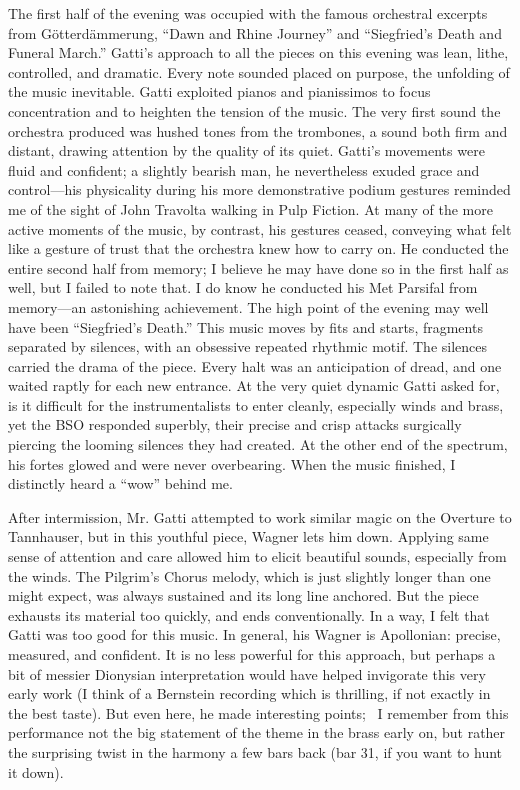 The first half of the evening was occupied with the famous orchestral excerpts from Götterdämmerung, “Dawn and Rhine Journey” and “Siegfried’s Death and Funeral March.” Gatti’s approach to all the pieces on this evening was lean, lithe, controlled, and dramatic. Every note sounded placed on purpose, the unfolding of the music inevitable. Gatti exploited pianos and pianissimos to focus concentration and to heighten the tension of the music. The very first sound the orchestra produced was hushed tones from the trombones, a sound both firm and distant, drawing attention by the quality of its quiet. Gatti’s movements were fluid and confident; a slightly bearish man, he nevertheless exuded grace and control—his physicality during his more demonstrative podium gestures reminded me of the sight of John Travolta walking in Pulp Fiction. At many of the more active moments of the music, by contrast, his gestures ceased, conveying what felt like a gesture of trust that the orchestra knew how to carry on. He conducted the entire second half from memory; I believe he may have done so in the first half as well, but I failed to note that. I do know he conducted his Met Parsifal from memory—an astonishing achievement. The high point of the evening may well have been “Siegfried’s Death.” This music moves by fits and starts, fragments separated by silences, with an obsessive repeated rhythmic motif. The silences carried the drama of the piece. Every halt was an anticipation of dread, and one waited raptly for each new entrance. At the very quiet dynamic Gatti asked for, is it difficult for the instrumentalists to enter cleanly, especially winds and brass, yet the BSO responded superbly, their precise and crisp attacks surgically piercing the looming silences they had created. At the other end of the spectrum, his fortes glowed and were never overbearing. When the music finished, I distinctly heard a “wow” behind me.

After intermission, Mr. Gatti attempted to work similar magic on the Overture to Tannhauser, but in this youthful piece, Wagner lets him down. Applying same sense of attention and care allowed him to elicit beautiful sounds, especially from the winds. The Pilgrim’s Chorus melody, which is just slightly longer than one might expect, was always sustained and its long line anchored. But the piece exhausts its material too quickly, and ends conventionally. In a way, I felt that Gatti was too good for this music. In general, his Wagner is Apollonian: precise, measured, and confident. It is no less powerful for this approach, but perhaps a bit of messier Dionysian interpretation would have helped invigorate this very early work (I think of a Bernstein recording which is thrilling, if not exactly in the best taste). But even here, he made interesting points;  I remember from this performance not the big statement of the theme in the brass early on, but rather the surprising twist in the harmony a few bars back (bar 31, if you want to hunt it down).

